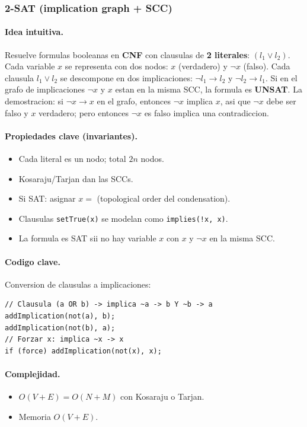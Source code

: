 ﻿\subsubsection{2-SAT (implication graph + SCC)}

\paragraph{Idea intuitiva.}
Resuelve formulas booleanas en \textbf{CNF} con clausulas de \textbf{2 literales}: $(l_1 \lor l_2)$. Cada variable $x$ se representa con dos nodos: $x$ (verdadero) y $\neg x$ (falso). Cada clausula $l_1 \lor l_2$ se descompone en dos implicaciones: $\neg l_1 \to l_2$ y $\neg l_2 \to l_1$. Si en el grafo de implicaciones $\neg x$ y $x$ estan en la misma SCC, la formula es \textbf{UNSAT}. La demostracion: si $\neg x \to x$ en el grafo, entonces $\neg x$ implica $x$, asi que $\neg x$ debe ser falso y $x$ verdadero; pero entonces $\neg x$ es falso implica una contradiccion.

\paragraph{Propiedades clave (invariantes).}
\begin{itemize}\setlength\itemsep{0pt}
	\item Cada literal es un nodo; total $2n$ nodos.
	\item Kosaraju/Tarjan dan las SCCs.
	\item Si SAT: asignar $x = $ (topological order del condensation).
	\item Clausulas \texttt{setTrue(x)} se modelan como \texttt{implies(!x, x)}.
	\item La formula es SAT sii no hay variable $x$ con $x$ y $\neg x$ en la misma SCC.
\end{itemize}

\paragraph{Codigo clave.}
Conversion de clausulas a implicaciones:
\begin{verbatim}
// Clausula (a OR b) -> implica ~a -> b Y ~b -> a
addImplication(not(a), b);
addImplication(not(b), a);
// Forzar x: implica ~x -> x
if (force) addImplication(not(x), x);
\end{verbatim}

\paragraph{Complejidad.}
\begin{itemize}\setlength\itemsep{0pt}
	\item $O(V + E) = O(N + M)$ con Kosaraju o Tarjan.
	\item Memoria $O(V + E)$.
\end{itemize}

